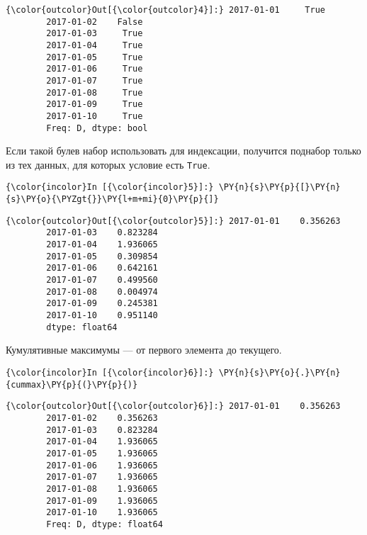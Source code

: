             \begin{Verbatim}[commandchars=\\\{\}]
{\color{outcolor}Out[{\color{outcolor}4}]:} 2017-01-01     True
        2017-01-02    False
        2017-01-03     True
        2017-01-04     True
        2017-01-05     True
        2017-01-06     True
        2017-01-07     True
        2017-01-08     True
        2017-01-09     True
        2017-01-10     True
        Freq: D, dtype: bool
\end{Verbatim}
        
    Если такой булев набор использовать для индексации, получится поднабор
только из тех данных, для которых условие есть \texttt{True}.

    \begin{Verbatim}[commandchars=\\\{\}]
{\color{incolor}In [{\color{incolor}5}]:} \PY{n}{s}\PY{p}{[}\PY{n}{s}\PY{o}{\PYZgt{}}\PY{l+m+mi}{0}\PY{p}{]}
\end{Verbatim}

            \begin{Verbatim}[commandchars=\\\{\}]
{\color{outcolor}Out[{\color{outcolor}5}]:} 2017-01-01    0.356263
        2017-01-03    0.823284
        2017-01-04    1.936065
        2017-01-05    0.309854
        2017-01-06    0.642161
        2017-01-07    0.499560
        2017-01-08    0.004974
        2017-01-09    0.245381
        2017-01-10    0.951140
        dtype: float64
\end{Verbatim}
        
    Кумулятивные максимумы --- от первого элемента до текущего.

    \begin{Verbatim}[commandchars=\\\{\}]
{\color{incolor}In [{\color{incolor}6}]:} \PY{n}{s}\PY{o}{.}\PY{n}{cummax}\PY{p}{(}\PY{p}{)}
\end{Verbatim}

            \begin{Verbatim}[commandchars=\\\{\}]
{\color{outcolor}Out[{\color{outcolor}6}]:} 2017-01-01    0.356263
        2017-01-02    0.356263
        2017-01-03    0.823284
        2017-01-04    1.936065
        2017-01-05    1.936065
        2017-01-06    1.936065
        2017-01-07    1.936065
        2017-01-08    1.936065
        2017-01-09    1.936065
        2017-01-10    1.936065
        Freq: D, dtype: float64
\end{Verbatim}
        
